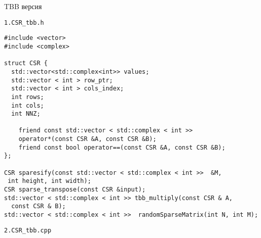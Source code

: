 \documentclass{report}
\begin{document}
\par TBB версия
\par \verb|1.CSR_tbb.h|
\begin{lstlisting}
#include <vector>
#include <complex>

struct CSR {
  std::vector<std::complex<int>> values;
  std::vector < int > row_ptr;
  std::vector < int > cols_index;
  int rows;
  int cols;
  int NNZ;

    friend const std::vector < std::complex < int >>
    operator*(const CSR &A, const CSR &B);
    friend const bool operator==(const CSR &A, const CSR &B);
};

CSR sparesify(const std::vector < std::complex < int >>  &M,
 int height, int width);
CSR sparse_transpose(const CSR &input);
std::vector < std::complex < int >> tbb_multiply(const CSR & A,
  const CSR & B);
std::vector < std::complex < int >>  randomSparseMatrix(int N, int M);
\end{lstlisting}
\par \verb|2.CSR_tbb.cpp|
\end{document}
